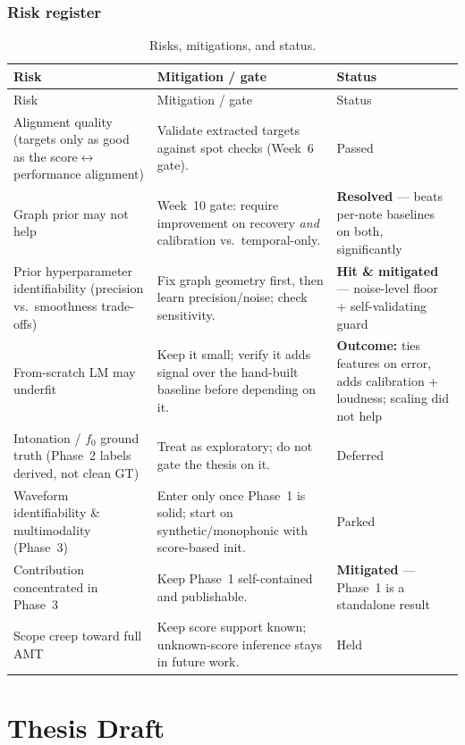 \documentclass[11pt,a4paper]{report}
\begin{document}
\section{Risk register}
\begin{longtable}{@{}p{3.9cm}p{6.0cm}p{2.9cm}@{}}
\caption{Risks, mitigations, and status.}\label{tab:risks}\\
\toprule
Risk & Mitigation / gate & Status \\
\midrule
\endfirsthead
\toprule
Risk & Mitigation / gate & Status \\
\midrule
\endhead
\bottomrule
\endfoot
Alignment quality (targets only as good as the score$\leftrightarrow$performance alignment) & Validate extracted targets against spot checks (Week~6 gate). & Passed \\
Graph prior may not help & Week~10 gate: require improvement on recovery \emph{and} calibration vs.\ temporal-only. & \textbf{Resolved} --- beats per-note baselines on both, significantly \\
Prior hyperparameter identifiability (precision vs.\ smoothness trade-offs) & Fix graph geometry first, then learn precision/noise; check sensitivity. & \textbf{Hit \& mitigated} --- noise-level floor + self-validating guard \\
From-scratch LM may underfit & Keep it small; verify it adds signal over the hand-built baseline before depending on it. & \textbf{Outcome:} ties features on error, adds calibration + loudness; scaling did not help \\
Intonation / $f_0$ ground truth (Phase~2 labels derived, not clean GT) & Treat as exploratory; do not gate the thesis on it. & Deferred \\
Waveform identifiability \& multimodality (Phase~3) & Enter only once Phase~1 is solid; start on synthetic/monophonic with score-based init. & Parked \\
Contribution concentrated in Phase~3 & Keep Phase~1 self-contained and publishable. & \textbf{Mitigated} --- Phase~1 is a standalone result \\
Scope creep toward full AMT & Keep score support known; unknown-score inference stays in future work. & Held \\
\end{longtable}


\part{Thesis Draft}\label{part:thesis}
\end{document}
